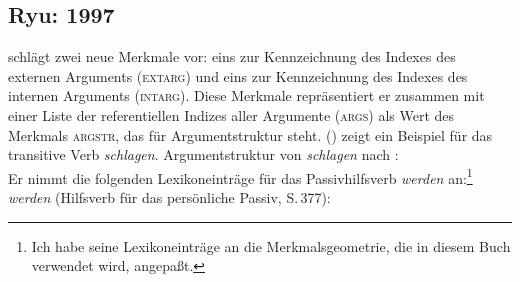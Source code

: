 {\subsection{Ryu: 1997}
\label{sec-ryu-passive}

\mbox{}\citet{Ryu97a} schlägt zwei neue Merkmale vor: eins zur Kennzeichnung des Indexes des
externen Arguments (\textsc{extarg}) und eins zur Kennzeichnung des Indexes des internen
Arguments (\textsc{intarg}). Diese Merkmale repräsentiert er zusammen mit einer Liste
der referentiellen Indizes aller Argumente (\textsc{args})
als Wert des Merkmals \textsc{argstr}, das für Argumentstruktur steht.
() zeigt ein Beispiel für das transitive Verb \emph{schlagen}.
\ea
Argumentstruktur von \emph{schlagen} nach :\\
\z
Er nimmt die folgenden Lexikoneinträge für das Passivhilfsverb \emph{werden} an:\footnote{
  Ich habe seine Lexikoneinträge an die Merkmalsgeometrie, die in diesem Buch verwendet wird,
  angepaßt.%
}
\eas
\emph{werden} (Hilfsverb für das persönliche Passiv, S.\,377):\\
\zs

}

